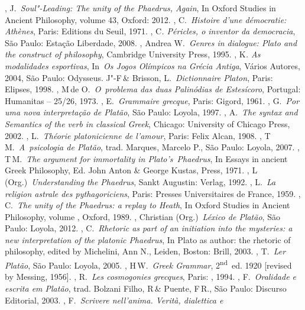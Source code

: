 \begin{bibliohedra}
, J.~\emph{Soul"-Leading: The unity of the Phaedrus, Again}, In
  Oxford Studies in Ancient Philosophy, volume 43, Oxford: 2012.
, C.~\emph{Histoire d'une démocratie: Athènes}, Paris: Editions
  du Seuil, 1971.
, C\emph{. Péricles, o inventor da democracia}, São Paulo:
  Estação Liberdade, 2008.
, Andrea W.~\emph{Genres in dialogue: Plato and the
  construct of philosophy}, Cambridge University Press, 1995.
, K\emph{. As modalidades esportivas}, In~\emph{Os Jogos
  Olímpicos na Grécia Antiga}, Vários Autores, 2004, São Paulo:
  Odysseus.
 J"-F\,\& Brisson, L.~\emph{Dictionnaire Platon}, Paris:
  Elipses, 1998.
, M\,de O.~\emph{O~problema das duas Palinódias de
  Estesícoro}, Portugal: Humanitas -- 25/\allowbreak{}26, 1973.
, E.~\emph{Grammaire grecque}, Paris: Gigord, 1961.
, G.~\emph{Por uma nova interpretação de Platão}, São Paulo:
  Loyola, 1997.
, A.~\emph{The syntax and Semantics of the verb in classical
  Greek}, Chicago: University of Chicago Press, 2002.
, L.~\emph{Théorie platonicienne de l'amour}, Paris: Felix Alcan,
  1908.
, T\,M.~\emph{A~psicologia de Platão}, trad. Marques, Marcelo
  P., São Paulo: Loyola, 2007.
, T\,M.~\emph{The argument for immortality in
  Plato's}~\emph{Phaedrus}, In Essays in ancient Greek Philosophy, Ed.
  John Anton \& George Kustas,  Press, 1971.
, L\,(Org.)~\emph{Understanding the Phaedrus}, Sankt Augustin:
  Verlag, 1992.
, L.~\emph{La religion astrale des pythagoriciens}, Paris:
  Presses Universitaires de France, 1959.
, C.~\emph{The unity of the Phaedrus: a replay to Heath}, In
  Oxford Studies in Ancient Philosophy, volume , Oxford, 1989.
, Christian (Org.)~\emph{Léxico de Platão}, São Paulo: Loyola,
  2012.
, C.~\emph{Rhetoric as part of an initiation into the
  mysteries: a new interpretation of the platonic Phaedrus}, In Plato as
  author: the rhetoric of philosophy, edited by Michelini, Ann N.,
  Leiden, Boston: Brill, 2003.
, T.~\emph{Ler Platão}, São Paulo: Loyola, 2005.
, H\,W.~\emph{Greek Grammar}, 2\textsuperscript{nd}~ed. 1920
  [revised by Messing, 1956].
, R.~\emph{Les cosmogonies grecques}, Paris: , 1994.
, F.~\emph{Oralidade e escrita em Platão}, trad. Bolzani
  Filho, R\,\& Puente, F\,R., São Paulo: Discurso Editorial, 2003.
, F.~\emph{Scrivere nell'anima. Verità, dialettica e
}
\end{bibliohedra}

